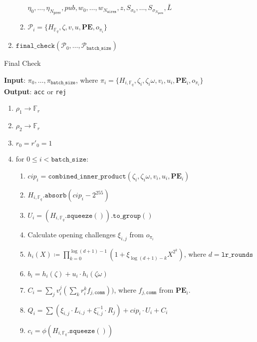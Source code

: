 \begin{algorithm}[H]
\begin{enumerate}
\begin{enumerate}
            $\eta_0, \dots, \eta_{N_{\texttt{prev}}}, pub, w_0, \dots, w_{N_{\texttt{wires}}}, z, S_{\sigma_0}, \dots, S_{\sigma_{N_{\texttt{perm}}}}, \bar{L}$
            \item $\mathcal{P}_i = \{H_{\mathbb{F}_q}, \zeta, v, u, \textbf{PE}, o_{\pi_i} \}$
        \end{enumerate}
        \item $\texttt{final\_check}(\mathcal{P}_0, \dots, \mathcal{P}_{\texttt{batch\_size}})$
    \end{enumerate}
\end{algorithm}

\begin{algorithm}[H]
    \caption{Final Check}
    \textbf{Input}: $\pi_0, \dots, \pi_{\texttt{batch\_size}}$, where $\pi_i = \{H_{i, \mathbb{F}_q}, \zeta_i, \zeta_i\omega, v_i, u_i,
    \textbf{PE}_i, o_{\pi_i} \}$ \\
    \textbf{Output}: \texttt{acc} or \texttt{rej}
    \begin{enumerate}
        \item $\rho_1 \rightarrow \mathbb{F}_r$
        \item $\rho_2 \rightarrow \mathbb{F}_r$
        \item $r_0 = r'_0 = 1$
        \item for $0 \leq i < \texttt{batch\_size}$:
        \begin{enumerate}
            \item $cip_i = \texttt{combined\_inner\_product}(\zeta_i, \zeta_i\omega, v_i, u_i, \textbf{PE}_i)$
            \item $H_{i, \mathbb{F}_q}.\texttt{absorb}(cip_i - 2^{255})$
            \item $U_i = (H_{i, \mathbb{F}_q}.\texttt{squeeze}()).\texttt{to\_group}()$
            \item Calculate opening challenges $\xi_{i, j}$ from $o_{\pi_i}$
            \item $h_i(X) \coloneqq \prod_{k=0}^{\log(d+1) - 1}(1 + \xi_{\log(d+1)-k}X^{2^k})$, where $d = \texttt{lr\_rounds}$
            \item $b_i = h_i(\zeta) + u_i \cdot h_i(\zeta\omega)$
            \item $C_i = \sum\limits_{j}v_i^j(\sum\limits_{k}r_i^k f_{j, \texttt{comm}}))$, where $f_{j, \texttt{comm}}$ from $\textbf{PE}_i$.
            \item $Q_i = \sum (\xi_{i, j} \cdot L_{i, j} + \xi_{i, j}^{-1} \cdot R_j) + cip_i \cdot U_i + C_i$
            \item $c_i = \phi(H_{i, \mathbb{F}_q}.\texttt{squeeze}())$

\end{enumerate}
\end{enumerate}
\end{algorithm}
